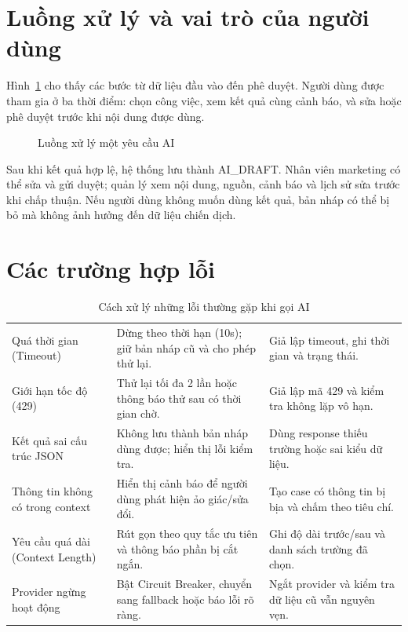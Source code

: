 \section{Luồng xử lý và vai trò của người dùng}

Hình~\ref{fig:v8-ai-flow} cho thấy các bước từ dữ liệu đầu vào đến phê duyệt. Người dùng được tham gia ở ba thời điểm: chọn công việc, xem kết quả cùng cảnh báo, và sửa hoặc phê duyệt trước khi nội dung được dùng.

\begin{figure}[h!]
\centering

\caption{Luồng xử lý một yêu cầu AI}
\label{fig:v8-ai-flow}
\end{figure}

Sau khi kết quả hợp lệ, hệ thống lưu thành AI\_DRAFT. Nhân viên marketing có thể sửa và gửi duyệt; quản lý xem nội dung, nguồn, cảnh báo và lịch sử sửa trước khi chấp thuận. Nếu người dùng không muốn dùng kết quả, bản nháp có thể bị bỏ mà không ảnh hưởng đến dữ liệu chiến dịch.

\section{Các trường hợp lỗi}

\begin{table}[h!]
\centering
\small
\caption{Cách xử lý những lỗi thường gặp khi gọi AI}
\label{tab:v8-ai-failures}
\begin{tabularx}{\textwidth}{|L{3.5cm}|Y|Y|}
\hline
{} &  & \\
\hline
Quá thời gian (Timeout) & Dừng theo thời hạn (10s); giữ bản nháp cũ và cho phép thử lại. & Giả lập timeout, ghi thời gian và trạng thái.\\
\hline
Giới hạn tốc độ (429) & Thử lại tối đa 2 lần hoặc thông báo thử sau có thời gian chờ. & Giả lập mã 429 và kiểm tra không lặp vô hạn.\\
\hline
Kết quả sai cấu trúc JSON & Không lưu thành bản nháp dùng được; hiển thị lỗi kiểm tra. & Dùng response thiếu trường hoặc sai kiểu dữ liệu.\\
\hline
Thông tin không có trong context & Hiển thị cảnh báo để người dùng phát hiện ảo giác/sửa đổi. & Tạo case có thông tin bị bịa và chấm theo tiêu chí.\\
\hline
Yêu cầu quá dài (Context Length) & Rút gọn theo quy tắc ưu tiên và thông báo phần bị cắt ngắn. & Ghi độ dài trước/sau và danh sách trường đã chọn.\\
\hline
Provider ngừng hoạt động & Bật Circuit Breaker, chuyển sang fallback hoặc báo lỗi rõ ràng. & Ngắt provider và kiểm tra dữ liệu cũ vẫn nguyên vẹn.\\
\hline
\end{tabularx}
\end{table}

